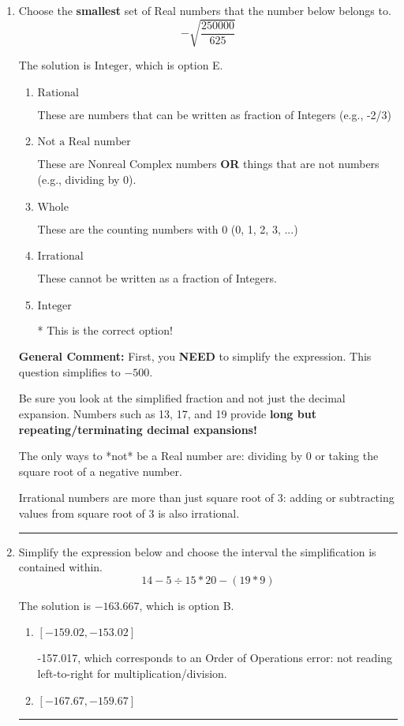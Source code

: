 \documentclass{extbook}[14pt]
\newcommand{\litem}[1]{\item #1

\rule{\textwidth}{0.4pt}}
\begin{document}
\begin{enumerate}\litem{
Choose the \textbf{smallest} set of Real numbers that the number below belongs to.
\[ -\sqrt{\frac{250000}{625}} \]

The solution is \( \text{Integer} \), which is option E.\begin{enumerate}[label=\Alph*.]
\item \( \text{Rational} \)

These are numbers that can be written as fraction of Integers (e.g., -2/3)
\item \( \text{Not a Real number} \)

These are Nonreal Complex numbers \textbf{OR} things that are not numbers (e.g., dividing by 0).
\item \( \text{Whole} \)

These are the counting numbers with 0 (0, 1, 2, 3, ...)
\item \( \text{Irrational} \)

These cannot be written as a fraction of Integers.
\item \( \text{Integer} \)

* This is the correct option!
\end{enumerate}

\textbf{General Comment:} First, you \textbf{NEED} to simplify the expression. This question simplifies to $-500$. 
 
 Be sure you look at the simplified fraction and not just the decimal expansion. Numbers such as 13, 17, and 19 provide \textbf{long but repeating/terminating decimal expansions!} 
 
 The only ways to *not* be a Real number are: dividing by 0 or taking the square root of a negative number. 
 
 Irrational numbers are more than just square root of 3: adding or subtracting values from square root of 3 is also irrational.
}
\litem{
Simplify the expression below and choose the interval the simplification is contained within.
\[ 14 - 5 \div 15 * 20 - (19 * 9) \]

The solution is \( -163.667 \), which is option B.\begin{enumerate}[label=\Alph*.]
\item \( [-159.02, -153.02] \)

 -157.017, which corresponds to an Order of Operations error: not reading left-to-right for multiplication/division.
\item \( [-167.67, -159.67] \)


\end{enumerate}}
\end{enumerate}
\end{document}
